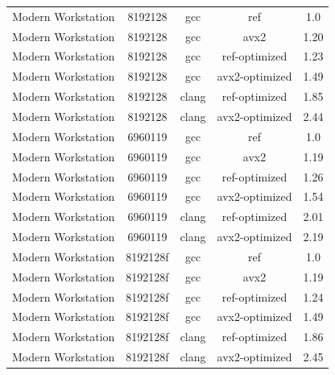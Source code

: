 \begin{table}
\begin{tabularx}{\linewidth}{X c c c c}
          Modern Workstation &              8192128 &                  gcc &                  ref &                  1.0\\
          Modern Workstation &              8192128 &                  gcc &                 avx2 &                1.20\\
          Modern Workstation &              8192128 &                  gcc &        ref-optimized &                1.23\\
          Modern Workstation &              8192128 &                  gcc &       avx2-optimized &                1.49\\
          Modern Workstation &              8192128 &                clang &        ref-optimized &                1.85\\
          Modern Workstation &              8192128 &                clang &       avx2-optimized &                2.44\\
          Modern Workstation &              6960119 &                  gcc &                  ref &                  1.0\\
          Modern Workstation &              6960119 &                  gcc &                 avx2 &                1.19\\
          Modern Workstation &              6960119 &                  gcc &        ref-optimized &                1.26\\
          Modern Workstation &              6960119 &                  gcc &       avx2-optimized &                1.54\\
          Modern Workstation &              6960119 &                clang &        ref-optimized &                2.01\\
          Modern Workstation &              6960119 &                clang &       avx2-optimized &                2.19\\
          Modern Workstation &             8192128f &                  gcc &                  ref &                  1.0\\
          Modern Workstation &             8192128f &                  gcc &                 avx2 &                1.19\\
          Modern Workstation &             8192128f &                  gcc &        ref-optimized &                1.24\\
          Modern Workstation &             8192128f &                  gcc &       avx2-optimized &                1.49\\
          Modern Workstation &             8192128f &                clang &        ref-optimized &                1.86\\
          Modern Workstation &             8192128f &                clang &       avx2-optimized &                2.45\\
        \bottomrule
    \end{tabularx}
\end{table}

